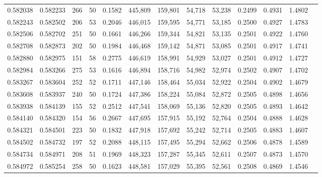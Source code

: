 \begin{tabular}{rrrrrrrrrrrrr}
0.582038 & 0.582233 &   266 &  50 &                                     0.1582 & 445,809 & 159,801 &  54,718 &  53,238 & 0.2499 & 0.4931 & 1.4802 \\
0.582243 & 0.582502 &   206 &  53 &                                     0.2046 & 446,015 & 159,595 &  54,771 &  53,185 & 0.2500 & 0.4927 & 1.4783 \\
0.582506 & 0.582702 &   251 &  50 &                                     0.1661 & 446,266 & 159,344 &  54,821 &  53,135 & 0.2501 & 0.4922 & 1.4760 \\
0.582708 & 0.582873 &   202 &  50 &                                     0.1984 & 446,468 & 159,142 &  54,871 &  53,085 & 0.2501 & 0.4917 & 1.4741 \\
0.582880 & 0.582975 &   151 &  58 &                                     0.2775 & 446,619 & 158,991 &  54,929 &  53,027 & 0.2501 & 0.4912 & 1.4727 \\
0.582984 & 0.583266 &   275 &  53 &                                     0.1616 & 446,894 & 158,716 &  54,982 &  52,974 & 0.2502 & 0.4907 & 1.4702 \\
0.583267 & 0.583604 &   252 &  52 &                                     0.1711 & 447,146 & 158,464 &  55,034 &  52,922 & 0.2504 & 0.4902 & 1.4679 \\
0.583608 & 0.583937 &   240 &  50 &                                     0.1724 & 447,386 & 158,224 &  55,084 &  52,872 & 0.2505 & 0.4898 & 1.4656 \\
0.583938 & 0.584139 &   155 &  52 &                                     0.2512 & 447,541 & 158,069 &  55,136 &  52,820 & 0.2505 & 0.4893 & 1.4642 \\
0.584140 & 0.584320 &   154 &  56 &                                     0.2667 & 447,695 & 157,915 &  55,192 &  52,764 & 0.2504 & 0.4888 & 1.4628 \\
0.584321 & 0.584501 &   223 &  50 &                                     0.1832 & 447,918 & 157,692 &  55,242 &  52,714 & 0.2505 & 0.4883 & 1.4607 \\
0.584502 & 0.584732 &   197 &  52 &                                     0.2088 & 448,115 & 157,495 &  55,294 &  52,662 & 0.2506 & 0.4878 & 1.4589 \\
0.584734 & 0.584971 &   208 &  51 &                                     0.1969 & 448,323 & 157,287 &  55,345 &  52,611 & 0.2507 & 0.4873 & 1.4570 \\
0.584972 & 0.585254 &   258 &  50 &                                     0.1623 & 448,581 & 157,029 &  55,395 &  52,561 & 0.2508 & 0.4869 & 1.4546 \\

\end{tabular}
